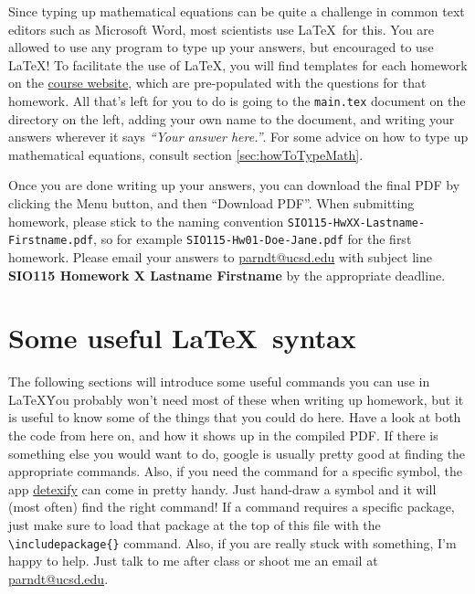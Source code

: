 \documentclass[letterus,times]{SIOpset}
\begin{document}
Since typing up mathematical equations can be quite a challenge in common text editors such as Microsoft Word, most scientists use \LaTeX\ for this. 
You are allowed to use any program to type up your answers, but encouraged to use \LaTeX! 
To facilitate the use of \LaTeX, you will find templates for each homework on the \href{http://glaciology.weebly.com/timetable.html}{course website}, which are pre-populated with the questions for that homework. 
All that's left for you to do is going to the \texttt{main.tex} document on the directory on the left, adding your own name to the document, and writing your answers wherever it says \emph{``Your answer here.''}. 
For some advice on how to type up mathematical equations, consult section \ref{sec:howToTypeMath}.

Once you are done writing up your answers, you can download the final PDF by clicking the Menu button, and then ``Download PDF''.
When submitting homework, please stick to the naming convention \texttt{SIO115-HwXX-Lastname-Firstname.pdf}, so for example \texttt{SIO115-Hw01-Doe-Jane.pdf} for the first homework.
Please email your answers to \href{mailto:parndt@ucsd.edu}{parndt@ucsd.edu} with subject line \textbf{SIO115 Homework X Lastname Firstname} by the appropriate deadline.


\section{Some useful \LaTeX\ syntax}
The following sections will introduce some useful commands you can use in \LaTeX\. 
You probably won't need most of these when writing up homework, but it is useful to know some of the things that you could do here. 
Have a look at both the code from here on, and how it shows up in the compiled PDF. 
If there is something else you would want to do, google is usually pretty good at finding the appropriate commands. 
Also, if you need the command for a specific symbol, the app \href{http://detexify.kirelabs.org/classify.html}{detexify} can come in pretty handy. 
Just hand-draw a symbol and it will (most often) find the right command!
If a command requires a specific package, just make sure to load that package at the top of this file with the \verb|\includepackage{}| command.
Also, if you are really stuck with something, I'm happy to help. Just talk to me after class or shoot me an email at \href{mailto:parndt@ucsd.edu}{parndt@ucsd.edu}.
\end{document}
